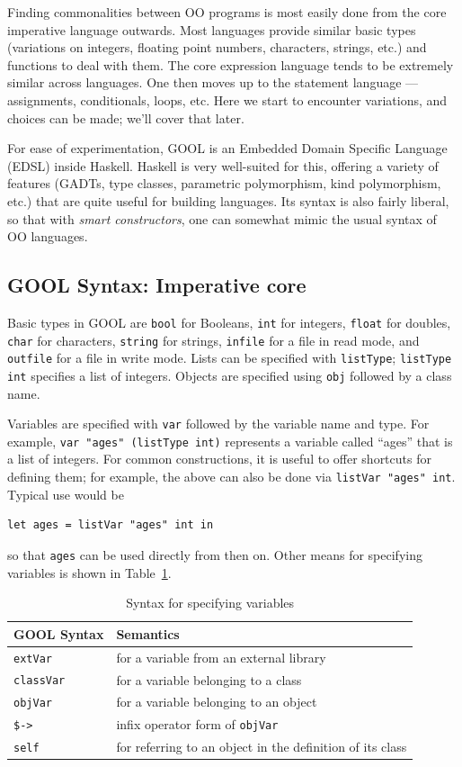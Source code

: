 \documentclass[sigplan,review,anonymous,prologue,dvipsnames]{acmart}
\begin{document}
Finding commonalities between OO programs is most easily done from the core 
imperative language outwards.
Most languages provide similar basic types (variations on integers,
floating point numbers, characters, strings, etc.) and functions to deal
with them. The core expression language tends to be extremely similar
across languages. One then moves up to the statement language ---
assignments, conditionals, loops, etc.  Here we start to encounter
variations, and choices can be made; we'll cover that later.

For ease of experimentation, GOOL is an Embedded
Domain Specific Language (EDSL) inside Haskell.  Haskell is very well-suited
for this, offering a variety of features (GADTs, type classes,
parametric polymorphism, kind polymorphism, etc.) that are quite useful
for building languages.  Its syntax is also fairly liberal, so that
with \emph{smart constructors}, one can somewhat mimic the
usual syntax of OO languages.

\subsection{GOOL Syntax: Imperative core} \label{ssec:syntax}

Basic types in GOOL are \verb|bool| for Booleans,
\verb|int| for integers, \verb|float| for doubles, \verb|char|
for characters, \verb|string| for strings, \verb|infile| for a file
in read mode, and \verb|outfile| for a file in write mode. Lists can be
specified with \verb|listType|; \verb|listType int|
specifies a list of integers. Objects are specified using
\verb|obj| followed by a class name.

Variables are specified with \verb|var| followed by the variable name and type.
For example, \verb|var "ages" (listType int)| represents a variable called
``ages'' that is a list of integers.  For common constructions,
it is useful to offer shortcuts for
defining them; for example, the above can also be done via
\verb|listVar "ages" int|. Typical use would be
\begin{lstlisting}
let ages = listVar "ages" int in
\end{lstlisting}
so that \verb|ages| can be used directly from then on. Other means for
specifying variables is shown in Table~\ref{tab:variables}.

\begin{table}[ht]
\caption{Syntax for specifying variables}
\begin{tabular}{p{} p{}}
  \textbf{GOOL Syntax} & \textbf{Semantics} \\
  \midrule
  \verb|extVar| & for a variable from an external library \\
  \verb|classVar| & for a variable belonging to a class \\
  \verb|objVar| & for a variable belonging to an object \\
  \verb|$->| & infix operator form of \verb|objVar| \\
  \verb|self| & for referring to an object in the definition of its class \\
\end{tabular}
\label{tab:variables}
\end{table}
\end{document}

